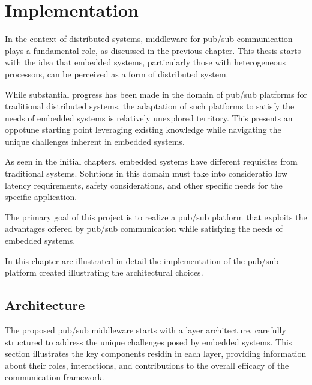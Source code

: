 

\chapter{Implementation}

In the context of distributed systems, middleware for pub/sub communication
plays a fundamental role, as discussed in the previous chapter. This thesis
starts with the idea that embedded systems, particularly those with
heterogeneous processors, can be perceived as a form of distributed system.

While substantial progress has been made in the domain of pub/sub platforms for
traditional distributed systems, the adaptation of such platforms to satisfy
the needs of embedded systems is relatively unexplored territory.
This presents an oppotune starting point leveraging existing knowledge while
navigating the unique challenges inherent in embedded systems.

As seen in the initial chapters, embedded systems have different requisites
from traditional systems.
Solutions in this domain must take into consideratio low latency requirements,
safety considerations, and other specific needs for the specific application.

The primary goal of this project is to realize a pub/sub platform that exploits
the advantages offered by pub/sub communication while satisfying the needs of
embedded systems.

In this chapter are illustrated in detail the implementation of the pub/sub
platform created illustrating the architectural choices.

\section{Architecture}

The proposed pub/sub middleware starts with a layer architecture, carefully
structured to address the unique challenges posed by embedded systems. This
section illustrates the key components residin in each layer, providing
information about their roles, interactions, and contributions to the overall
efficacy of the communication framework.

